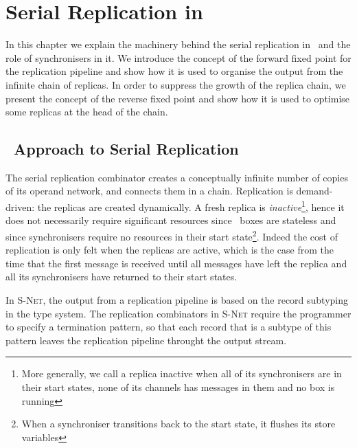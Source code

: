 \chapter{Serial Replication in \ak\ }\label{chap_sr}
In this chapter we explain the machinery behind the serial replication in \ak\ and the role of synchronisers in it. We introduce the concept of the forward fixed point for the replication pipeline and show how it is used to organise the output from the infinite chain of replicas. In order to suppress the growth of the replica chain, we present the concept of the reverse fixed point and show how it is used to optimise some replicas at the head of the chain.


    \section{\ak\ Approach to Serial Replication}
The serial replication combinator creates a conceptually infinite number of copies of its operand network, and connects them in a chain. Replication is demand-driven: the replicas are created dynamically. A fresh replica is \emph{inactive}\footnote{More generally, we call a replica inactive when all of its synchronisers are in their start states, none of its channels has messages in them and no box is running}, hence it does not necessarily require significant resources since \ak\ boxes are stateless and since synchronisers require no resources in their start state\footnote{When a synchroniser transitions back to the start state, it flushes its store variables}. Indeed the cost of replication is only felt when the replicas are active, which is the case from the time that the first message is received until all messages have left the replica and all its synchronisers have returned to their start states.

In \textsc{S-Net}, the output from a replication pipeline is based on the record subtyping in the type system. The replication combinators in \textsc{S-Net} require the programmer to specify a termination pattern, so that each record that is a subtype of this pattern leaves the replication pipeline throught the output stream.

